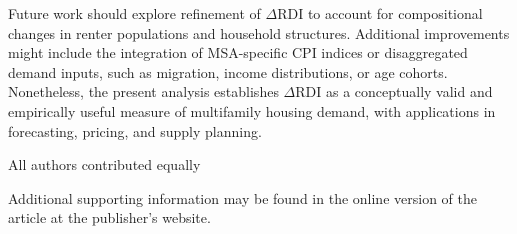\documentclass[APA,Times1COL]{WileyNJDv5} %
\begin{document}
Future work should explore refinement of \(\Delta\text{RDI}\) to account for compositional changes in renter populations and household structures. Additional improvements might include the integration of MSA-specific CPI indices or disaggregated demand inputs, such as migration, income distributions, or age cohorts. Nonetheless, the present analysis establishes \(\Delta\text{RDI}\) as a conceptually valid and empirically useful measure of multifamily housing demand, with applications in forecasting, pricing, and supply planning.


{}

All authors contributed equally










Additional supporting information may be found in the
online version of the article at the publisher’s website.










\nocite{*}%
\end{document}
